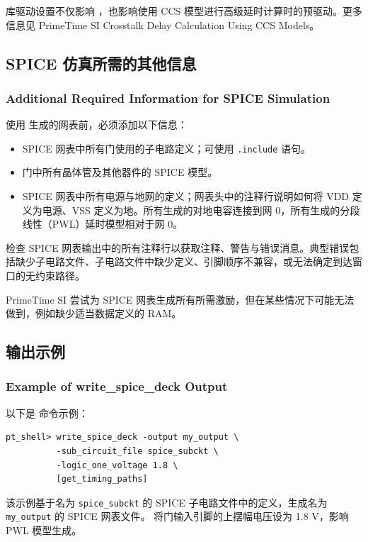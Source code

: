 库驱动设置不仅影响 ，也影响使用 CCS 模型进行高级延时计算时的预驱动。更多信息见 PrimeTime SI Crosstalk Delay Calculation Using CCS Models。

\subsection{SPICE 仿真所需的其他信息}
\subsubsection*{Additional Required Information for SPICE Simulation}

使用  生成的网表前，必须添加以下信息：
\begin{itemize}
  \item SPICE 网表中所有门使用的子电路定义；可使用 \texttt{.include} 语句。
  \item 门中所有晶体管及其他器件的 SPICE 模型。
  \item SPICE 网表中所有电源与地网的定义；网表头中的注释行说明如何将 VDD 定义为电源、VSS 定义为地。所有生成的对地电容连接到网 0，所有生成的分段线性（PWL）延时模型相对于网 0。
\end{itemize}

检查 SPICE 网表输出中的所有注释行以获取注释、警告与错误消息。典型错误包括缺少子电路文件、子电路文件中缺少定义、引脚顺序不兼容，或无法确定到达窗口的无约束路径。

PrimeTime SI 尝试为 SPICE 网表生成所有所需激励，但在某些情况下可能无法做到，例如缺少适当数据定义的 RAM。

\subsection{ 输出示例}
\subsubsection*{Example of write\_spice\_deck Output}

以下是  命令示例：
\begin{lstlisting}
pt_shell> write_spice_deck -output my_output \
          -sub_circuit_file spice_subckt \
          -logic_one_voltage 1.8 \
          [get_timing_paths]
\end{lstlisting}

该示例基于名为 \texttt{spice\_subckt} 的 SPICE 子电路文件中的定义，生成名为 \texttt{my\_output} 的 SPICE 网表文件。 将门输入引脚的上摆幅电压设为 1.8 V，影响 PWL 模型生成。

